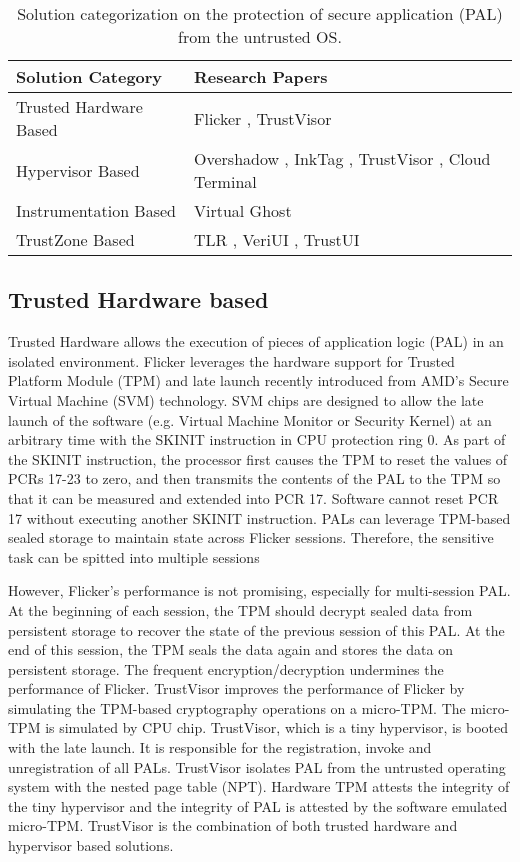 \begin{table*}[ht]
	\centering
	\begin{tabular}{|l|l|}
		\hline
		\textbf{Solution Category}      & \textbf{Research Papers} \\ \hline
		Trusted Hardware Based & Flicker \cite{Flicker}, TrustVisor \cite{TrustVisor} \\ \hline
		Hypervisor Based       & Overshadow \cite{Overshadow}, InkTag \cite{InkTag}, TrustVisor \cite{TrustVisor}, Cloud Terminal \cite{CloudTerminal}\\ \hline
		Instrumentation Based  & Virtual Ghost \cite{VirtualGhost}\\ \hline
		TrustZone Based        & TLR \cite{TLR}, VeriUI \cite{VeriUI}, TrustUI \cite{TrustUI}\\ \hline
	\end{tabular}
	\caption{Solution categorization on the protection of secure application
	(PAL) from the untrusted OS.}
	\label{my-label}
\end{table*}

\subsection{Trusted Hardware based}

Trusted Hardware allows the execution of pieces of application logic (PAL) in an
isolated environment. Flicker \cite{Flicker} leverages the hardware support for
Trusted Platform Module (TPM) \cite{TPM} and late launch recently introduced from AMD's
Secure Virtual Machine (SVM) technology. SVM chips are designed to allow the
late launch of the software (e.g. Virtual Machine Monitor or Security Kernel) at
an arbitrary time with the SKINIT instruction in CPU protection ring 0. As part
of the SKINIT instruction, the processor first causes the TPM to reset the
values of PCRs 17-23 to zero, and then transmits the contents of the PAL to the
TPM so that it can be measured and extended into PCR 17. Software cannot reset
PCR 17 without executing another SKINIT instruction. PALs can leverage TPM-based
sealed storage to maintain state across Flicker sessions. Therefore, the
sensitive task can be spitted into multiple sessions

However, Flicker's performance is not promising, especially for multi-session
PAL. At the beginning of each session, the TPM should decrypt sealed data from
persistent storage to recover the state of the previous session of this PAL. At
the end of this session, the TPM seals the data again and stores the data on
persistent storage. The frequent encryption/decryption undermines the
performance of Flicker. TrustVisor \cite{TrustVisor} improves the performance of
Flicker by simulating the TPM-based cryptography operations on a micro-TPM. The
micro-TPM is simulated by CPU chip. TrustVisor, which is a tiny hypervisor, is
booted with the late launch. It is responsible for the registration, invoke and
unregistration of all PALs.  TrustVisor isolates PAL from the untrusted
operating system with the nested page table (NPT). Hardware TPM attests the
integrity of the tiny hypervisor and the integrity of PAL is attested by the
software emulated micro-TPM. TrustVisor is the combination of both trusted
hardware and hypervisor based solutions. 

